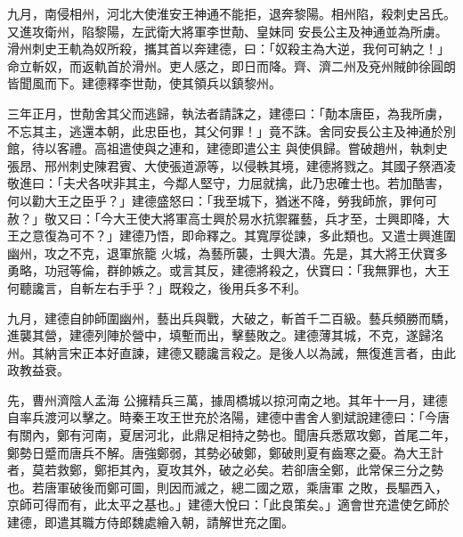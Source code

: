 \begin{pinyinscope}
 九月，南侵相州，河北大使淮安王神通不能拒，退奔黎陽。相州陷，殺刺史呂氏。又進攻衛州，陷黎陽，左武衛大將軍李世勣、皇妹同
 安長公主及神通並為所虜。滑州刺史王軌為奴所殺，攜其首以奔建德，曰：「奴殺主為大逆，我何可納之！」命立斬奴，而返軌首於滑州。吏人感之，即日而降。齊、濟二州及兗州賊帥徐圓朗皆聞風而下。建德釋李世勣，使其領兵以鎮黎州。



 三年正月，世勣舍其父而逃歸，執法者請誅之，建德曰：「勣本唐臣，為我所虜，不忘其主，逃還本朝，此忠臣也，其父何罪！」竟不誅。舍同安長公主及神通於別館，待以客禮。高祖遣使與之連和，建德即遣公主
 與使俱歸。嘗破趙州，執刺史張昂、邢州刺史陳君賓、大使張道源等，以侵軼其境，建德將戮之。其國子祭酒凌敬進曰：「夫犬各吠非其主，今鄰人堅守，力屈就擒，此乃忠確士也。若加酷害，何以勸大王之臣乎？」建德盛怒曰：「我至城下，猶迷不降，勞我師旅，罪何可赦？」敬又曰：「今大王使大將軍高士興於易水抗禦羅藝，兵才至，士興即降，大王之意復為可不？」建德乃悟，即命釋之。其寬厚從諫，多此類也。又遣士興進圍幽州，攻之不克，退軍旅籠
 火城，為藝所襲，士興大潰。先是，其大將王伏寶多勇略，功冠等倫，群帥嫉之。或言其反，建德將殺之，伏寶曰：「我無罪也，大王何聽讒言，自斬左右手乎？」既殺之，後用兵多不利。



 九月，建德自帥師圍幽州，藝出兵與戰，大破之，斬首千二百級。藝兵頻勝而驕，進襲其營，建德列陣於營中，填塹而出，擊藝敗之。建德薄其城，不克，遂歸洺州。其納言宋正本好直諫，建德又聽讒言殺之。是後人以為誡，無復進言者，由此政教益衰。



 先，曹州濟陰人孟海
 公擁精兵三萬，據周橋城以掠河南之地。其年十一月，建德自率兵渡河以擊之。時秦王攻王世充於洛陽，建德中書舍人劉斌說建德曰：「今唐有關內，鄭有河南，夏居河北，此鼎足相持之勢也。聞唐兵悉眾攻鄭，首尾二年，鄭勢日蹙而唐兵不解。唐強鄭弱，其勢必破鄭，鄭破則夏有齒寒之憂。為大王計者，莫若救鄭，鄭拒其內，夏攻其外，破之必矣。若卻唐全鄭，此常保三分之勢也。若唐軍破後而鄭可圖，則因而滅之，總二國之眾，乘唐軍
 之敗，長驅西入，京師可得而有，此太平之基也。」建德大悅曰：「此良策矣。」適會世充遣使乞師於建德，即遣其職方侍郎魏處繪入朝，請解世充之圍。




\end{pinyinscope}
